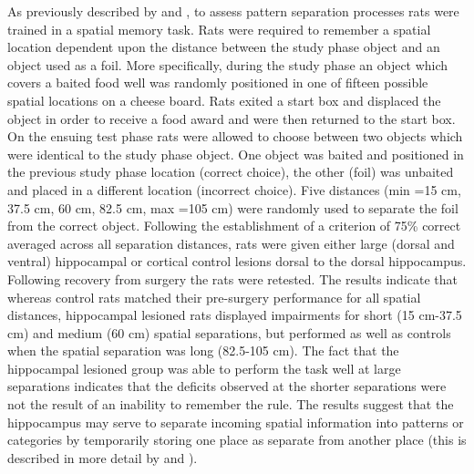 \documentclass[doc, longtable]{apa6}
\begin{document}
As previously described by \textcite{Kesner2013e} and \textcite{Gilbert1998a, Gilbert2001a}, to assess pattern separation processes rats were trained in a spatial memory task. Rats were required to remember a spatial location dependent upon the distance between the study phase object and an object used as a foil. More specifically, during the study phase an object which covers a baited food well was randomly positioned in one of fifteen possible spatial locations on a cheese board. Rats exited a start box and displaced the object in order to receive a food award and were then returned to the start box. On the ensuing test phase rats were allowed to choose between two objects which were identical to the study phase object. One object was baited and positioned in the previous study phase location (correct choice), the other (foil) was unbaited and placed in a different location (incorrect choice). Five distances (min =15 cm, 37.5 cm, 60 cm, 82.5 cm, max =105 cm) were randomly used to separate the foil from the correct object. Following the establishment of a criterion of 75\% correct averaged across all separation distances, rats were given either large (dorsal and ventral) hippocampal or cortical control lesions dorsal to the dorsal hippocampus. Following recovery from surgery the rats were retested. The results indicate that whereas control rats matched their pre-surgery performance for all spatial distances, hippocampal lesioned rats displayed impairments for short (15 cm-37.5 cm) and medium (60 cm) spatial separations, but performed as well as controls when the spatial separation was long (82.5-105 cm). The fact that the hippocampal lesioned group was able to perform the task well at large separations indicates that the deficits observed at the shorter separations were not the result of an inability to remember the rule. The results suggest that the hippocampus may serve to separate incoming spatial information into patterns or categories by temporarily storing one place as separate from another place (this is described in more detail by \cite{hunsaker2013operation} and \cite{OReilly2001a}).
\end{document}
